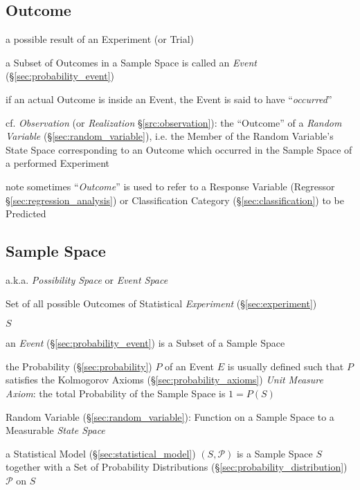 \subsection{Outcome}\label{sec:outcome}

a possible result of an Experiment (or Trial)

a Subset of Outcomes in a Sample Space is called an \emph{Event}
(\S\ref{sec:probability_event})

if an actual Outcome is inside an Event, the Event is said to have
``\emph{occurred}''

\fist cf. \emph{Observation} (or \emph{Realization} \S\ref{src:observation}):
the ``Outcome'' of a \emph{Random Variable} (\S\ref{sec:random_variable}), i.e.
the Member of the Random Variable's State Space corresponding to an Outcome
which occurred in the Sample Space of a performed Experiment

\fist note sometimes ``\emph{Outcome}'' is used to refer to a Response Variable
(Regressor \S\ref{sec:regression_analysis}) or Classification Category
(\S\ref{sec:classification}) to be Predicted



\subsection{Sample Space}\label{sec:sample_space}

a.k.a. \emph{Possibility Space} or \emph{Event Space}

Set of all possible Outcomes of Statistical \emph{Experiment}
(\S\ref{sec:experiment})

$S$

an \emph{Event} (\S\ref{sec:probability_event}) is a Subset of a Sample Space

the Probability (\S\ref{sec:probability}) $P$ of an Event $E$ is usually defined
such that $P$ satisfies the Kolmogorov Axioms (\S\ref{sec:probability_axioms})
\fist \emph{Unit Measure Axiom}: the total Probability of the Sample Space is
$1 = P(S)$

Random Variable (\S\ref{sec:random_variable}): Function on a Sample Space to a
Measurable \emph{State Space}

a Statistical Model (\S\ref{sec:statistical_model}) $(S,\mathcal{P})$ is a
Sample Space $S$ together with a Set of Probability Distributions
(\S\ref{sec:probability_distribution}) $\mathcal{P}$ on $S$

